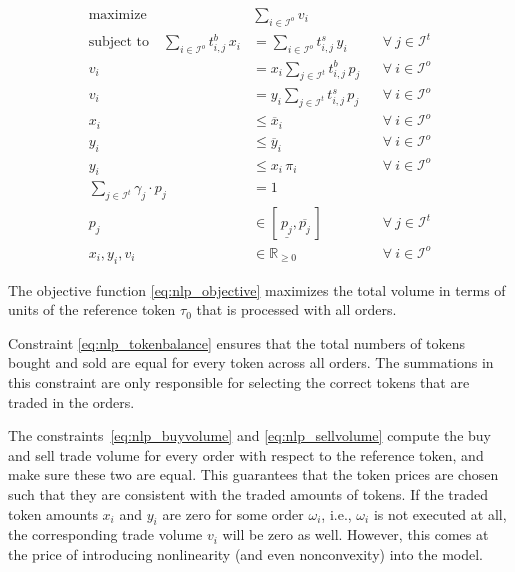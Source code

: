 \documentclass[11pt,parskip=full]{scrartcl}%
\newcommand*{\ie}{i.e., }
\newcommand*{\wrt}{with respect to }
\newcommand*{\itokens}{\mathcal{I}^t}       %
\newcommand*{\iorders}{\mathcal{I}^o}       %
\begin{document}
\begin{subequations}
\begin{align}
  \text{maximize} \quad & \sum\limits_{i \in \iorders} v_i
  \label{eq:nlp_objective}
  \\[2mm]
  \text{subject to} \quad
  \sum\limits_{i \in \iorders} t^b_{i,j} \, x_i
  &= \sum\limits_{i \in \iorders} t^s_{i,j} \, y_i
  && \forall \> j \in \itokens
  \label{eq:nlp_tokenbalance}
  \\[2mm]
  v_i
  &= x_i \sum\limits_{j \in \itokens} t^b_{i,j} \, p_j
  && \forall \> i \in \iorders
  \label{eq:nlp_buyvolume}
  \\[1mm]
  v_i
  &= y_i \sum\limits_{j \in \itokens} t^s_{i,j} \, p_j
  && \forall \> i \in \iorders
  \label{eq:nlp_sellvolume}
  \\[2mm]
  x_i &\le \overline{x}_i
  && \forall \> i \in \iorders
  \label{eq:nlp_limit_x}
  \\[1mm]
  y_i &\le \overline{y}_i
  && \forall \> i \in \iorders
  \label{eq:nlp_limit_y}
  \\[1mm]
  y_i &\le x_i \, \pi_i
  && \forall \> i \in \iorders
  \label{eq:nlp_limit_pi}
  \\[2mm]
  \sum\limits_{j \in \itokens} \gamma_j \cdot p_j
  &= 1
  \label{eq:nlp_reftoken}
  \\[1mm]
  p_j
  &\in [\,\underline{p_j},\overline{p_j}\,]
  && \forall \> j \in \itokens
  \\[1mm]
  x_i, y_i, v_i &\in \mathbb{R}_{\ge 0}
  && \forall \> i \in \iorders
\end{align}
\label{eq:nlp}
\end{subequations}

The objective function \eqref{eq:nlp_objective} maximizes the total volume in terms of units of
the reference token $ \tau_0 $ that is processed with all orders.

Constraint \eqref{eq:nlp_tokenbalance} ensures that the total numbers of tokens bought and sold are
equal for every token across all orders.
The summations in this constraint are only responsible for selecting the correct tokens that are
traded in the orders.

The constraints~\eqref{eq:nlp_buyvolume} and \eqref{eq:nlp_sellvolume} compute the buy and sell
trade volume for every order \wrt the reference token, and make sure these two are equal.
This guarantees that the token prices are chosen such that they are consistent with the traded
amounts of tokens.
If the traded token amounts $ x_i $ and $ y_i $ are zero for some order $ \omega_i $, \ie
$ \omega_i $ is not executed at all, the corresponding trade volume $ v_i $ will be zero as well.
However, this comes at the price of introducing nonlinearity (and even nonconvexity) into the
model.
\end{document}
